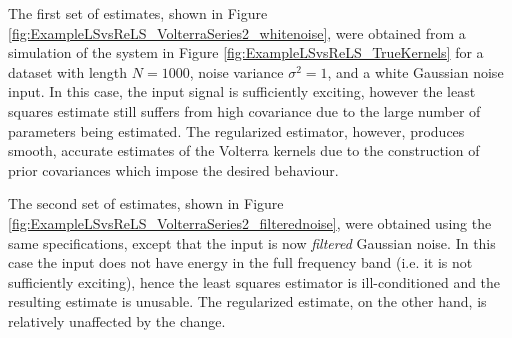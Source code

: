 The first set of estimates, shown in Figure \ref{fig:ExampleLSvsReLS_VolterraSeries2_whitenoise}, were obtained from a simulation of the system in Figure \ref{fig:ExampleLSvsReLS_TrueKernels} for a dataset with length $N=1000$, noise variance $\sigma^2 = 1$, and a white Gaussian noise input. In this case, the input signal is sufficiently exciting, however the least squares estimate still suffers from high covariance due to the large number of parameters being estimated. The regularized estimator, however, produces smooth, accurate estimates of the Volterra kernels due to the construction of prior covariances which impose the desired behaviour. 

The second set of estimates, shown in Figure \ref{fig:ExampleLSvsReLS_VolterraSeries2_filterednoise}, were obtained using the same specifications, except that the input is now \emph{filtered} Gaussian noise. In this case the input does not have energy in the full frequency band (i.e. it is not sufficiently exciting), hence the least squares estimator is ill-conditioned and the resulting estimate is unusable. The regularized estimate, on the other hand, is relatively unaffected by the change. 

\vspace{10mm}

